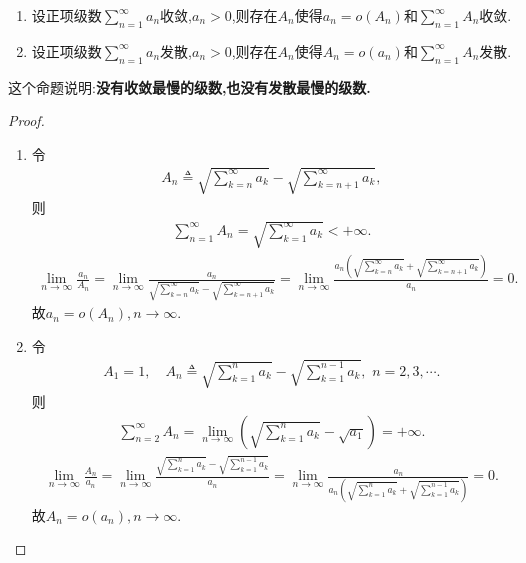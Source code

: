 \documentclass[../../main.tex]{subfiles}%
\begin{document}
\begin{proposition}\label{proposition:没有收敛最慢的级数也没有发散最慢的级数}
\begin{enumerate}
\item 设正项级数$\sum\limits_{n=1}^\infty a_n$收敛,$a_n>0$,则存在$A_n$使得$a_n=o(A_n)$和$\sum\limits_{n=1}^\infty A_n$收敛.

\item 设正项级数$\sum\limits_{n=1}^\infty a_n$发散,$a_n>0$,则存在$A_n$使得$A_n=o(a_n)$和$\sum\limits_{n=1}^\infty A_n$发散.
\end{enumerate}
\end{proposition}
\begin{note}
这个命题说明:\textbf{没有收敛最慢的级数,也没有发散最慢的级数.}
\end{note}
\begin{proof}
\begin{enumerate}
\item 令
\begin{align*}
A_n\triangleq \sqrt{\sum_{k=n}^{\infty}{a_k}}-\sqrt{\sum_{k=n+1}^{\infty}{a_k}},
\end{align*}
则
\begin{align*}
\sum_{n=1}^{\infty}{A_n}=\sqrt{\sum_{k=1}^{\infty}{a_k}}<+\infty .
\end{align*}
\begin{align*}
\lim_{n\rightarrow \infty}\frac{a_n}{A_n}=\lim_{n\rightarrow \infty}\frac{a_n}{\sqrt{\sum\limits_{k=n}^{\infty}{a_k}}-\sqrt{\sum\limits_{k=n+1}^{\infty}{a_k}}}=\lim_{n\rightarrow \infty}\frac{a_n\left( \sqrt{\sum\limits_{k=n}^{\infty}{a_k}}+\sqrt{\sum\limits_{k=n+1}^{\infty}{a_k}} \right)}{a_n}=0.
\end{align*}
故$a_n=o\left( A_n \right) ,n\rightarrow \infty .$

\item 令
\begin{align*}
A_1=1,\quad A_n\triangleq \sqrt{\sum_{k=1}^n{a_k}}-\sqrt{\sum_{k=1}^{n-1}{a_k}},\,\,n=2,3,\cdots .
\end{align*}
则
\begin{align*}
\sum_{n=2}^{\infty}{A_n}=\lim_{n\rightarrow \infty}\left( \sqrt{\sum_{k=1}^n{a_k}}-\sqrt{a_1} \right) =+\infty .
\end{align*}
\begin{align*}
\lim_{n\rightarrow \infty}\frac{A_n}{a_n}=\lim_{n\rightarrow \infty}\frac{\sqrt{\sum\limits_{k=1}^n{a_k}}-\sqrt{\sum\limits_{k=1}^{n-1}{a_k}}}{a_n}=\lim_{n\rightarrow \infty}\frac{a_n}{a_n\left( \sqrt{\sum\limits_{k=1}^n{a_k}}+\sqrt{\sum\limits_{k=1}^{n-1}{a_k}} \right)}=0.
\end{align*}
故$A_n=o\left( a_n \right) ,n\rightarrow \infty .$
\end{enumerate}

\end{proof}
\end{document}
